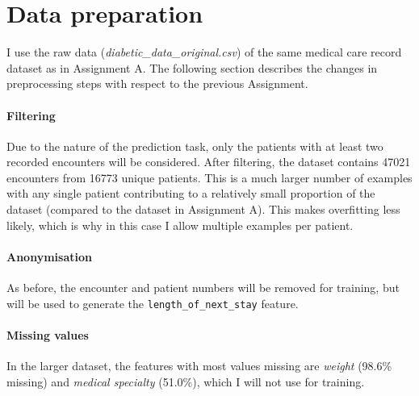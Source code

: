 \documentclass[10pt, twocolumn]{article}
\begin{document}
\thispagestyle{first}
\pagestyle{plain}


\section{Data preparation}

I use the raw data (\textit{diabetic\_data\_original.csv}) of the same medical care record dataset \cite{strack2014dataset} as in Assignment A. The following section describes the changes in preprocessing steps with respect to the previous Assignment.

\paragraph{Filtering}
Due to the nature of the prediction task, only the patients with at least two recorded encounters will be considered. After filtering, the dataset contains 47021 encounters from 16773 unique patients. This is a much larger number of examples with any single patient contributing to a relatively small proportion of the dataset (compared to the dataset in Assignment A). This makes overfitting less likely, which is why in this case I allow multiple examples per patient. 

\paragraph{Anonymisation} As before, the encounter and patient numbers will be removed for training, but will be used to generate the \texttt{length\_of\_next\_stay} feature.

\paragraph{Missing values} In the larger dataset, the features with most values missing are \textit{weight} (98.6\% missing) and \textit{medical specialty} (51.0\%), which I will not use for training.
\end{document}
